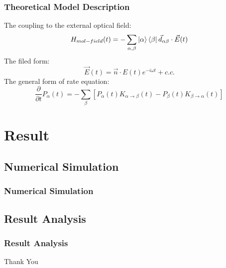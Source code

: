 \documentclass{beamer}
\begin{document}
\begin{frame}
\frametitle{Theoretical Model Description}
The coupling to the external optical field:
\begin{equation}
    H_{mol-field}(t)=-\sum_{\alpha,\beta}\ket{\alpha}\bra{\beta}\vec{d}_{\alpha\beta}\cdot\vec{E}(t)
\end{equation}
The filed form:
\begin{equation}
    \vec{E}(t) = \vec{n}\cdot E(t)e^{-i\omega t} + c.c.
\end{equation}
The general form of rate equation:
\begin{equation}
    \frac{\partial}{\partial t} P_{\alpha}(t) = -\sum_{\beta}\left[P_{\alpha}(t) K_{\alpha\rightarrow\beta}(t)-P_{\beta}(t) K_{\beta\rightarrow \alpha}(t)\right]
\end{equation}
\end{frame}

\section{Result}

    \subsection{Numerical Simulation}

\begin{frame}
\frametitle{Numerical Simulation}

\end{frame}

    \subsection{Result Analysis}

\begin{frame}
    \frametitle{Result Analysis}
        
\end{frame}

\begin{frame}
\Huge{\centerline{Thank You}}
\end{frame}
\end{document}
